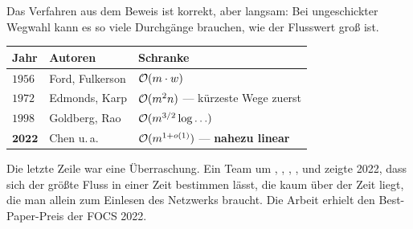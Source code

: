\begin{forschung}
Das Verfahren aus dem Beweis ist korrekt, aber langsam: Bei ungeschickter Wegwahl kann es so viele Durchgänge brauchen, wie der Flusswert groß ist.

\begin{center}
{\small
\renewcommand{\arraystretch}{1.45}
\begin{tabular}{@{}P{1.6cm}P{2.4cm}P{3.6cm}@{}}
\toprule
\textbf{Jahr} & \textbf{Autoren} & \textbf{Schranke}\\
\midrule
$1956$ & Ford, Fulkerson & $\mathcal{O}(m \cdot w)$\\
$1972$ & Edmonds, Karp & $\mathcal{O}(m^2 n)$ --- kürzeste Wege zuerst\\
$1998$ & Goldberg, Rao & $\mathcal{O}(m^{3/2}\log\ldots)$\\
$\mathbf{2022}$ & Chen u.\,a. & $\mathcal{O}(m^{1+o(1)})$ --- \textbf{nahezu linear}\\
\bottomrule
\end{tabular}}
\end{center}

Die letzte Zeile war eine Überraschung. Ein Team um , , , ,  und  zeigte 2022, dass sich der größte Fluss in einer Zeit bestimmen lässt, die kaum über der Zeit liegt, die man allein zum Einlesen des Netzwerks braucht. Die Arbeit erhielt den Best-Paper-Preis der FOCS 2022.

\begin{center}
\begin{minipage}{0.88\textwidth}
\end{minipage}
\end{center}
\end{forschung}

